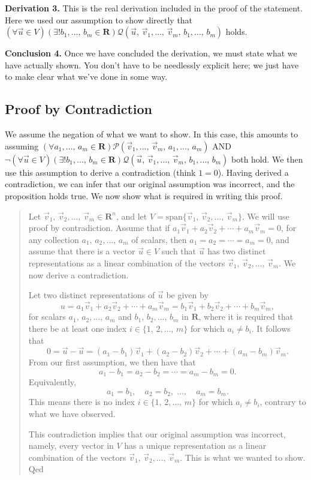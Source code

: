 \documentclass[a4paper,11pt]{article}
\newcommand{\R}{\mathbf{R}}
\newcommand{\PP}{\mathscr{P}}
\newcommand{\QQ}{\mathscr{Q}}
\begin{document}
{\bf Derivation 3.} This is the real derivation included in the proof of the
statement. Here we used our assumption to show directly that $(\forall\vec u \in
V)(\exists!b_1,\dots,\,b_m \in \R)\QQ(\vec u,\,\vec v_1,\dots,\,\vec
v_m,\,b_1,\dots,\,b_m)$ holds.

{\bf Conclusion 4.} Once we have concluded the derivation, we must state what we
have actually shown. You don't have to be needlessly explicit here; we just have
to make clear what we've done in some way.

\subsection*{Proof by Contradiction}

We assume the negation of what we want to show. In this case, this amounts to
assuming $(\forall a_1,\dots,\,a_m \in \R)\PP(\vec v_1,\dots,\,\vec
v_m,\,a_1,\dots,\,a_m)$ AND $\neg(\forall\vec u \in V)(\exists!b_1,\dots,\,b_m
\in \R)\QQ(\vec u,\,\vec v_1,\dots,\,\vec v_m,\,b_1,\dots,\,b_m)$ both hold. We
then use this assumption to derive a contradiction (think $1=0$). Having derived
a contradiction, we can infer that our original assumption was incorrect, and
the proposition holds true. We now show what is required in writing this proof.

\begin{quotation}
  Let $\vec v_1,\,\vec v_2,\dots,\,\vec v_m \in \R^n$, and let
  $V=\text{span}\{\vec v_1,\,\vec v_2,\dots,\,\vec v_m\}$. We will use proof by
  contradiction. Assume that if $a_1\vec v_1 + a_2\vec v_2 + \cdots + a_m\vec
  v_m = 0$, for any collection $a_1,\,a_2,\dots,\,a_m$ of scalars, then
  $a_1=a_2=\cdots=a_m=0$, and assume that there is a vector $\vec u \in V$ such
  that $\vec u$ has two distinct representations as a linear combination 
  of the vectors $\vec v_1,\,\vec v_2,\dots,\,\vec v_m$. We now derive a
  contradiction.

  Let two distinct representations of $\vec u$ be given by
  \[
    u = a_1\vec v_1 + a_2\vec v_2 + \cdots + a_m\vec v_m =
    b_1\vec v_1 + b_2\vec v_2 + \cdots + b_m\vec v_m,
  \]
  for scalars $a_1,\,a_2,\dots,\,a_m$ and $b_1,\,b_2,\dots,\,b_m$ in $\R$, where
  it is required that there be at least one index $i \in \{1,\,2,\dots,\,m\}$
  for which $a_i \neq b_i$. It follows that
  \[
    0 = \vec u-\vec u =
    (a_1-b_1)\vec v_1 + (a_2-b_2)\vec v_2 + \cdots + (a_m-b_m)\vec v_m.
  \]
  From our first assumption, we then have that
  \[
    a_1-b_1=a_2-b_2=\cdots=a_m-b_m=0.
  \]
  Equivalently,
  \[
    a_1=b_1, \quad a_2=b_2,\;\dots,\quad a_m=b_m.
  \]
  This means there is no index $i \in \{1,\,2,\dots,\,m\}$ for which $a_i \neq
  b_i$, contrary to what we have observed.

  This contradiction implies that our original assumption was incorrect,
  namely, every vector in $V$ has a unique representation as a linear
  combination of the vectors $\vec v_1,\,\vec v_2,\dots,\,\vec v_m$. This is
  what we wanted to show. 
  \hfill{\sc Qed}
\end{quotation}
\end{document}

